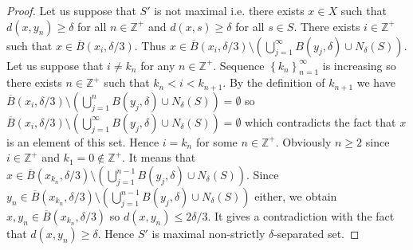 \documentclass[11pt, reqno]{amsart}
\theoremstyle{definition}
\numberwithin{theorem}{section}
\theoremstyle{definition}
\theoremstyle{definition}
\theoremstyle{definition}
\theoremstyle{definition}
\newcommand{\brac}[1]{\left({#1}\right)}
\theoremstyle{definition}
\numberwithin{claim}{section}
\theoremstyle{definition}
\theoremstyle{definition}
\theoremstyle{definition}
\theoremstyle{definition}
\theoremstyle{definition}
\theoremstyle{remboldstyle}
\begin{document}
\begin{proof}
Let us suppose that $S'$ is not maximal i.e. there exists $x \in X$ such that $d(x, y_n) \ge \delta$ for all $n \in \mathbb{Z}^+$ and $d(x, s) \ge \delta$ for all $s \in S$. There exists $i \in \mathbb{Z}^+$ such that $x \in \overline{B}\brac{x_i, \delta/3}$. Thus $x \in \overline{B}\brac{x_i, \delta/3} \setminus \brac{\bigcup_{j=1}^{\infty} B\brac{y_j, \delta} \cup N_\delta(S)}$. Let us suppose that $i \neq k_n$ for any $n \in \mathbb{Z}^+$. Sequence $\left\{k_n\right\}_{n=1}^\infty$ is increasing so there exists $n \in \mathbb{Z}^+$ such that $k_n < i < k_{n+1}$. By the definition of $k_{n+1}$ we have $\overline{B}\brac{x_i, \delta/3} \setminus \brac{\bigcup_{j=1}^{n} B\brac{y_j, \delta} \cup N_\delta(S)} = \emptyset$ so $\overline{B}\brac{x_i, \delta/3} \setminus \brac{\bigcup_{j=1}^{\infty} B\brac{y_j, \delta} \cup N_\delta(S)} = \emptyset$ which contradicts the fact that $x$ is an element of this set. Hence $i = k_n$ for some $n \in \mathbb{Z}^+$. Obviously $n \ge 2$ since $i \in \mathbb{Z}^+$ and $k_1 = 0 \notin \mathbb{Z}^+$. It means that $x \in \overline{B}\brac{x_{k_n}, \delta/3} \setminus \brac{\bigcup_{j=1}^{n-1} B\brac{y_j, \delta} \cup N_\delta(S)}$. Since $y_n \in \overline{B}\brac{x_{k_n}, \delta/3} \setminus \brac{\bigcup_{j=1}^{n-1} B\brac{y_j, \delta} \cup N_\delta(S)}$ either, we obtain $x, y_n \in \overline{B}\brac{x_{k_n}, \delta/3}$ so $d(x, y_n) \le 2\delta /3$. It gives a contradiction with the fact that $d(x, y_n) \ge \delta$. Hence $S'$ is maximal non-strictly $\delta$-separated set.
\end{proof}   
\end{document}
